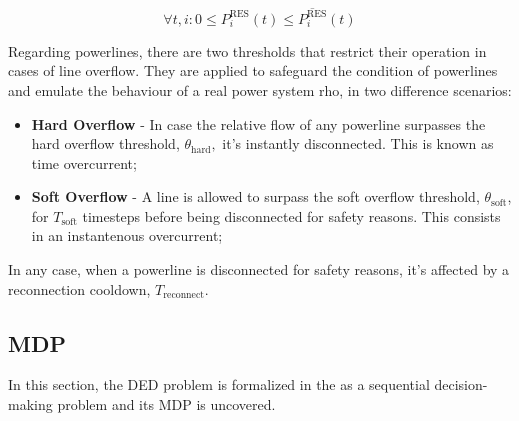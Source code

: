 \begin{equation} \label{eq:res-limits}
	\forall t, i: 0 \leq P^\text{RES}_i (t) \leq \overline{P^\text{RES}_i} (t)
\end{equation}

Regarding powerlines, there are two thresholds that restrict their operation in cases of line overflow. They are applied to safeguard the condition of powerlines and emulate the behaviour of a real power system $\text{rho}$, in two difference scenarios:
\begin{itemize}
	\item \textbf{Hard Overflow} - In case the relative flow of any powerline surpasses the hard overflow threshold, $\theta_\text{hard},$ it's instantly disconnected. This is known as time overcurrent;
	\item \textbf{Soft Overflow} - A line is allowed to surpass the soft overflow threshold, $\theta_\text{soft}$, for $T_\text{soft}$ timesteps before being disconnected for safety reasons. This consists in an instantenous overcurrent;
\end{itemize}
In any case, when a powerline is disconnected for safety reasons, it's affected by a reconnection cooldown, $T_\text{reconnect}$.

\subsection{\acf{MDP}}

In this section, the \ac{DED} problem is formalized in the as a sequential decision-making problem and its \ac{MDP} is uncovered. 

